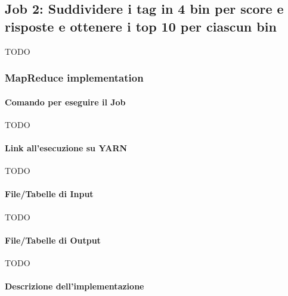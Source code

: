 

\subsection[%
    Job 2: Suddividere tag in base a score e risposte%
  ]{%
    Job 2: Suddividere i tag in 4 bin per score e risposte e ottenere i top 10 per ciascun bin%
  }\label{subsec:job2}

  TODO

  \subsubsection{MapReduce implementation}\label{subsub:job2:mapreduce}

  \paragraph{Comando per eseguire il Job}\label{par:job2:mapreduce:cmd}

  TODO

  \paragraph{Link all’esecuzione su YARN}\label{par:job2:mapreduce:yarn}

  TODO

  \paragraph{File/Tabelle di Input}\label{par:job2:mapreduce:input}

  TODO

  \paragraph{File/Tabelle di Output}\label{par:job2:mapreduce:output}

  TODO

  \paragraph{Descrizione dell’implementazione}\label{par:job2:mapreduce:implementation}

